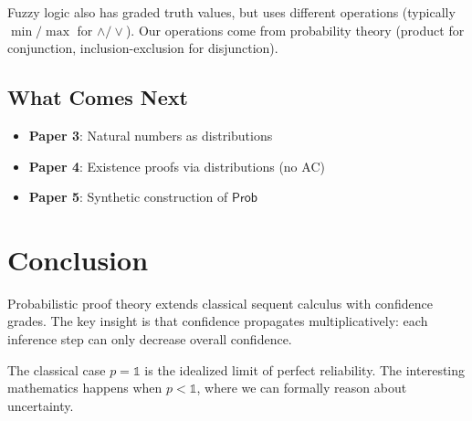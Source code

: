 \documentclass[11pt,a4paper]{article}
\newcommand{\Prob}{\mathsf{Prob}}
\newcommand{\pone}{\mathbb{1}}
\begin{document}
Fuzzy logic also has graded truth values, but uses different operations (typically $\min/\max$ for $\land/\lor$). Our operations come from probability theory (product for conjunction, inclusion-exclusion for disjunction).

\subsection{What Comes Next}

\begin{itemize}
    \item \textbf{Paper 3}: Natural numbers as distributions
    \item \textbf{Paper 4}: Existence proofs via distributions (no AC)
    \item \textbf{Paper 5}: Synthetic construction of $\Prob$
\end{itemize}

\section{Conclusion}

Probabilistic proof theory extends classical sequent calculus with confidence grades. The key insight is that confidence propagates multiplicatively: each inference step can only decrease overall confidence.

The classical case $p = \pone$ is the idealized limit of perfect reliability. The interesting mathematics happens when $p < \pone$, where we can formally reason about uncertainty.


\end{document}
